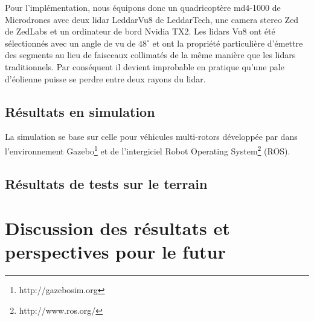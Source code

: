 Pour l'implémentation, nous équipons donc un quadricoptère md4-1000 de Microdrones avec deux lidar LeddarVu8 de LeddarTech, une camera stereo Zed de ZedLabs et un ordinateur de bord Nvidia TX2. Les lidars Vu8 ont été sélectionnés avec un angle de vu de $48^{\circ}$ et ont la propriété particulière d'émettre des segments au lieu de faisceaux collimatés de la même manière que les lidars traditionnels. Par conséquent il devient improbable en pratique qu'une pale d'éolienne puisse se perdre entre deux rayons du lidar.

\subsection{Résultats en simulation}
\label{subsec:results_simu}
La simulation se base sur celle pour véhicules multi-rotors développée par \citep{Furrer2016} dans l'environnement Gazebo\footnote{http://gazebosim.org} et de l'intergiciel Robot Operating System\footnote{http://www.ros.org/} (ROS).

\subsection{Résultats de tests sur le terrain}
\label{subsec:results_field}


\section{Discussion des résultats et perspectives pour le futur}
